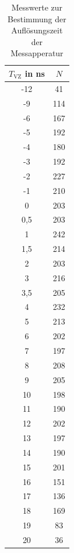 \begin{table}[H]
\centering
\caption{Messwerte zur Bestimmung der Auflösungszeit der Messapperatur}
\label{tab:Verzoegerung}
\begin{tabular}{c|c}
$T_{\text{VZ}}$ in ns& $N$\\
\hline
-12& 41\\
-9& 114\\
-6& 167\\
-5& 192\\
-4& 180\\
-3& 192\\
-2& 227\\
-1& 210\\
0& 203\\
0,5& 203\\
1& 242\\
1,5& 214\\
2& 203\\
3& 216\\
3,5& 205\\
4& 232\\
5& 213\\
6& 202\\
7& 197\\
8& 208\\
9& 205\\
10& 198\\
11& 190\\
12& 202\\
13& 197\\
14& 190\\
15& 201\\
16& 151\\
17& 136\\
18& 169\\
19& 83\\
20& 36\\
\end{tabular}
\end{table}
